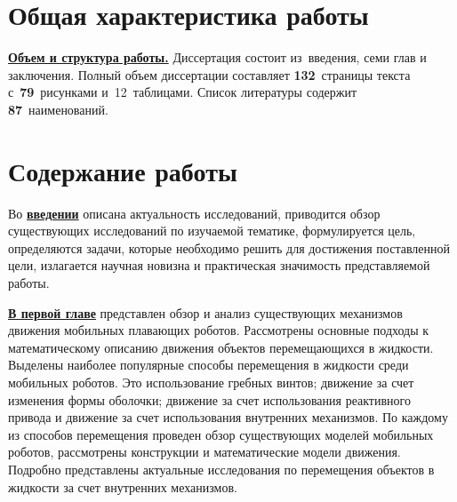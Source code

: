 \section*{Общая характеристика работы}

\newcommand{\actuality}{\underline{\textbf{\actualityTXT}}}
\newcommand{\progress}{\underline{\textbf{\progressTXT}}}
\newcommand{\aim}{\underline{{\textbf\aimTXT}}}
\newcommand{\tasks}{\underline{\textbf{\tasksTXT}}}
\newcommand{\novelty}{\underline{\textbf{\noveltyTXT}}}
\newcommand{\influence}{\underline{\textbf{\influenceTXT}}}
\newcommand{\methods}{\underline{\textbf{\methodsTXT}}}
\newcommand{\defpositions}{\underline{\textbf{\defpositionsTXT}}}
\newcommand{\reliability}{\underline{\textbf{\reliabilityTXT}}}
\newcommand{\probation}{\underline{\textbf{\probationTXT}}}
\newcommand{\contribution}{\underline{\textbf{\contributionTXT}}}
\newcommand{\publications}{\underline{\textbf{\publicationsTXT}}}




\underline{\textbf{Объем и структура работы.}} Диссертация состоит из~введения,
семи глав и заключения. Полный объем диссертации составляет
\textbf{132}~страницы текста с~\textbf{79}~рисунками и~12~таблицами. Список
литературы содержит \textbf{87}~наименований.



\section*{Содержание работы}
Во \underline{\textbf{введении}} описана актуальность исследований, приводится обзор существующих исследований по изучаемой тематике, формулируется цель, определяются задачи, которые необходимо решить для достижения поставленной цели, излагается научная новизна и практическая значимость представляемой работы.


\underline{\textbf{В первой главе}} представлен обзор и анализ существующих механизмов движения мобильных плавающих роботов. Рассмотрены основные подходы к математическому описанию движения объектов перемещающихся в жидкости. Выделены наиболее популярные способы перемещения в жидкости среди мобильных роботов. Это использование гребных винтов; движение за счет изменения формы оболочки; движение за счет использования реактивного привода и движение за счет использования внутренних механизмов. По каждому из способов перемещения проведен обзор существующих моделей мобильных роботов, рассмотрены конструкции и математические модели движения. Подробно представлены актуальные исследования по перемещения объектов в жидкости за счет внутренних механизмов. %

